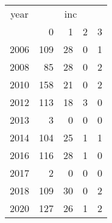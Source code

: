 \footnotesize\begin{tabular}[t]{lrrrr}
\toprule
\multicolumn{1}{c}{year} & \multicolumn{4}{c}{inc} \\
\cmidrule(l{3pt}r{3pt}){1-1} \cmidrule(l{3pt}r{3pt}){2-5}
  & 0 & 1 & 2 & 3\\
\midrule
2006 & 109 & 28 & 0 & 1\\
2008 & 85 & 28 & 0 & 2\\
2010 & 158 & 21 & 0 & 2\\
2012 & 113 & 18 & 3 & 0\\
2013 & 3 & 0 & 0 & 0\\
2014 & 104 & 25 & 1 & 1\\
2016 & 116 & 28 & 1 & 0\\
2017 & 2 & 0 & 0 & 0\\
2018 & 109 & 30 & 0 & 2\\
2020 & 127 & 26 & 1 & 2\\
\bottomrule
\end{tabular}
